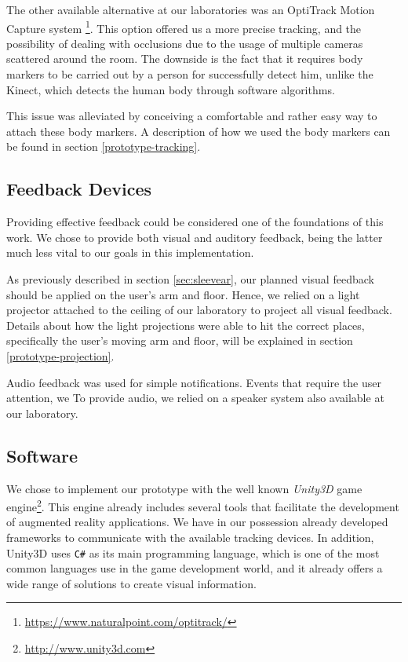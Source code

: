 The other available alternative at our laboratories was an OptiTrack Motion Capture system \footnote{\url{https://www.naturalpoint.com/optitrack/}}. 
This option offered us a more precise tracking, and the possibility of dealing with occlusions due to the usage of multiple cameras scattered around the room. 
The downside is the fact that it requires body markers to be carried out by a person for successfully detect him, unlike the 
Kinect, which detects the human body through software algorithms. 

This issue was alleviated by conceiving a comfortable and rather easy way to attach these body markers. A description of how we used the body markers can be found in section \ref{prototype-tracking}.


\subsection{Feedback Devices}

Providing effective feedback could be considered one of the foundations of this work. 
We chose to provide both visual and auditory feedback, being the latter much less vital to our goals in this implementation.

As previously described in section \ref{sec:sleevear}, our planned visual feedback should be applied on the user's arm and floor. Hence, we relied on a light projector attached to the ceiling of our laboratory to project all visual feedback.
Details about how the light projections were able to hit the correct places, specifically the user's moving arm and floor, will be explained in section \ref{prototype-projection}.

Audio feedback was used for simple notifications. Events that require the user attention, we 
To provide audio, we relied on a speaker system also available at our laboratory.

\subsection{Software}

We chose to implement our prototype with the well known \emph{Unity3D} game engine\footnote{\url{http://www.unity3d.com}}.
This engine already includes several tools that facilitate the development of augmented reality applications. We have in our possession already developed frameworks to communicate with the available tracking devices. In addition, Unity3D uses \texttt{C\#} as its main programming language, which is one of the most common languages use in the game development world, and it already offers a wide range of solutions to create visual information.

